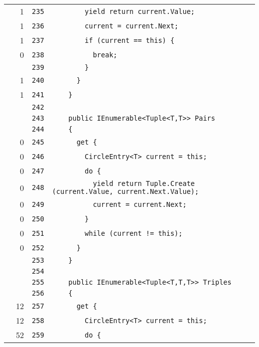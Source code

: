 \documentclass[a4paper,10pt]{article}
\begin{document}
\begin{longtable}[l]{lrrl}
\cellcolor{green} & 1 & \verb~235~ & \verb~        yield return current.Value;~\\
\cellcolor{green} & 1 & \verb~236~ & \verb~        current = current.Next;~\\
\cellcolor{green} & 1 & \verb~237~ & \verb~        if (current == this) {~\\
\cellcolor{red} & 0 & \verb~238~ & \verb~          break;~\\
\cellcolor{gray} &  & \verb~239~ & \verb~        }~\\
\cellcolor{green} & 1 & \verb~240~ & \verb~      }~\\
\cellcolor{green} & 1 & \verb~241~ & \verb~    }~\\
\cellcolor{gray} &  & \verb~242~ & \verb~~\\
\cellcolor{gray} &  & \verb~243~ & \verb~    public IEnumerable<Tuple<T,T>> Pairs~\\
\cellcolor{gray} &  & \verb~244~ & \verb~    {~\\
\cellcolor{red} & 0 & \verb~245~ & \verb~      get {~\\
\cellcolor{red} & 0 & \verb~246~ & \verb~        CircleEntry<T> current = this;~\\
\cellcolor{red} & 0 & \verb~247~ & \verb~        do {~\\
\cellcolor{red} & 0 & \verb~248~ & \verb~          yield return Tuple.Create (current.Value, current.Next.Value);~\\
\cellcolor{red} & 0 & \verb~249~ & \verb~          current = current.Next;~\\
\cellcolor{red} & 0 & \verb~250~ & \verb~        }~\\
\cellcolor{red} & 0 & \verb~251~ & \verb~        while (current != this);~\\
\cellcolor{red} & 0 & \verb~252~ & \verb~      }~\\
\cellcolor{gray} &  & \verb~253~ & \verb~    }~\\
\cellcolor{gray} &  & \verb~254~ & \verb~~\\
\cellcolor{gray} &  & \verb~255~ & \verb~    public IEnumerable<Tuple<T,T,T>> Triples~\\
\cellcolor{gray} &  & \verb~256~ & \verb~    {~\\
\cellcolor{green} & 12 & \verb~257~ & \verb~      get {~\\
\cellcolor{green} & 12 & \verb~258~ & \verb~        CircleEntry<T> current = this;~\\
\cellcolor{green} & 52 & \verb~259~ & \verb~        do {~\\

\end{longtable}
\end{document}
